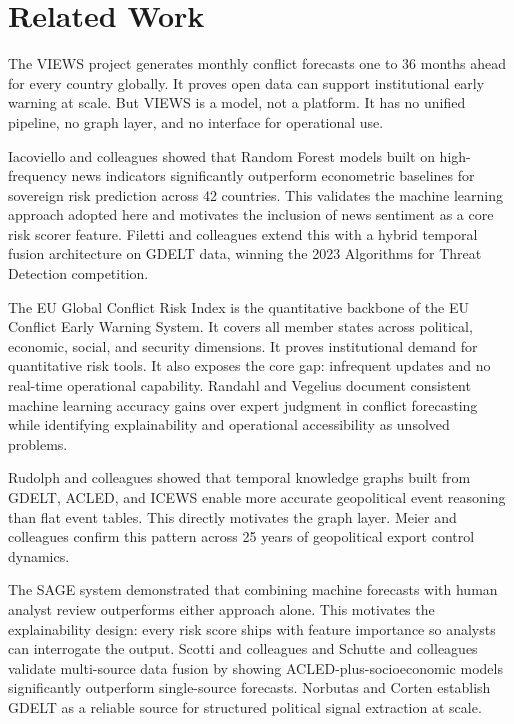 \documentclass[12pt, onecolumn]{IEEEtran}
\begin{document}
\section{Related Work}

The VIEWS project \cite{views2023} generates monthly conflict forecasts one to 36 months ahead for every country globally. It proves open data can support institutional early warning at scale. But VIEWS is a model, not a platform. It has no unified pipeline, no graph layer, and no interface for operational use.

Iacoviello and colleagues \cite{iacoviello2025} showed that Random Forest models built on high-frequency news indicators significantly outperform econometric baselines for sovereign risk prediction across 42 countries. This validates the machine learning approach adopted here and motivates the inclusion of news sentiment as a core risk scorer feature. Filetti and colleagues \cite{tft2025} extend this with a hybrid temporal fusion architecture on GDELT data, winning the 2023 Algorithms for Threat Detection competition.

The EU Global Conflict Risk Index \cite{gcri2020} is the quantitative backbone of the EU Conflict Early Warning System. It covers all member states across political, economic, social, and security dimensions. It proves institutional demand for quantitative risk tools. It also exposes the core gap: infrequent updates and no real-time operational capability. Randahl and Vegelius \cite{mlconflict2024} document consistent machine learning accuracy gains over expert judgment in conflict forecasting while identifying explainability and operational accessibility as unsolved problems.

Rudolph and colleagues \cite{rudolph2026} showed that temporal knowledge graphs built from GDELT, ACLED, and ICEWS enable more accurate geopolitical event reasoning than flat event tables. This directly motivates the graph layer. Meier and colleagues \cite{temporalgraph2025} confirm this pattern across 25 years of geopolitical export control dynamics.

The SAGE system \cite{sage2024} demonstrated that combining machine forecasts with human analyst review outperforms either approach alone. This motivates the explainability design: every risk score ships with feature importance so analysts can interrogate the output. Scotti and colleagues \cite{migration2025} and Schutte and colleagues \cite{displacement2025} validate multi-source data fusion by showing ACLED-plus-socioeconomic models significantly outperform single-source forecasts. Norbutas and Corten \cite{gdelt2020} establish GDELT as a reliable source for structured political signal extraction at scale.
\end{document}
